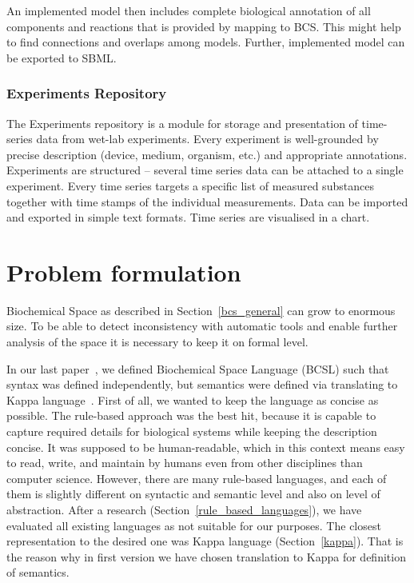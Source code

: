 \documentclass[12pt]{fithesis2}
\begin{document}
An implemented model then includes complete biological annotation of all components and reactions that is provided by mapping to BCS. This might help to find connections and overlaps among models. Further, implemented model can be exported to SBML.

\subsection{Experiments Repository}

The Experiments repository is a module for storage and presentation of time-series data from wet-lab experiments. Every experiment is well-grounded by precise description (device, medium, organism, etc.) and appropriate annotations. Experiments are structured -- several time series data can be attached to a single experiment. Every time series targets a specific list of measured substances together with time stamps of the individual measurements. Data can be imported and exported in simple text formats. Time series are visualised in a chart.	

\chapter{Problem formulation}
\label{problem_formulation}

Biochemical Space as described in Section~\ref{bcs_general} can grow to enormous size. To be able to detect inconsistency with
automatic tools and enable further analysis of the space it is necessary to keep it on formal level.


In our last paper~\cite{Ded201627}, we defined Biochemical Space Language (BCSL) such that syntax was defined independently, but semantics were defined via translating to Kappa language~\cite{kappa_formal}. First of all, we wanted to keep the language as concise as possible. The rule-based approach was the best hit, because it is capable to capture required details for biological systems while keeping the description concise. It was supposed to be human-readable, which in this context means easy to read, write, and maintain by humans even from other disciplines than computer science. However, there are many rule-based languages, and each of them is slightly different on syntactic and semantic level and also on level of abstraction. After a research (Section~\ref{rule_based_languages}), we have evaluated all existing languages as not suitable for our purposes. The closest representation to the desired one was Kappa language (Section~\ref{kappa}). That is the reason why in first version we have chosen translation to Kappa for definition of semantics.
\end{document}
